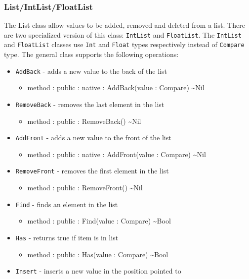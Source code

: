 \documentclass[11pt]{article}
\begin{document}
\subsubsection{List/IntList/FloatList}
The List class allow values to be added, removed and deleted from a
list.  There are two specialized version of this class:
\texttt{IntList} and \texttt{FloatList}.  The \texttt{IntList} and
\texttt{FloatList} classes use \texttt{Int} and \texttt{Float} types
respectively instead of \texttt{Compare} type.  The general class
supports the following operations:
\begin{itemize}
\item \texttt{AddBack} - adds a new value to the back of the list
  \begin{itemize}
  \item method : public : native : AddBack(value : Compare) \textasciitilde Nil
  \end{itemize}
\item \texttt{RemoveBack} - removes the last element in the list
  \begin{itemize}
  \item method : public : RemoveBack() \textasciitilde Nil
  \end{itemize}
\item \texttt{AddFront} - adds a new value to the front of the list
  \begin{itemize}
  \item method : public : native : AddFront(value : Compare) \textasciitilde Nil
  \end{itemize}
\item \texttt{RemoveFront} - removes the first element in the list
  \begin{itemize}
  \item method : public : RemoveFront() \textasciitilde Nil
  \end{itemize}
\item \texttt{Find} - finds an element in the list
  \begin{itemize}
  \item method : public : Find(value : Compare) \textasciitilde Bool
  \end{itemize}
\item \texttt{Has} - returns true if item is in list
  \begin{itemize}
  \item method : public : Has(value : Compare) \textasciitilde Bool
  \end{itemize}
\item \texttt{Insert} - inserts a new value in the position pointed to

\end{itemize}
\end{document}
